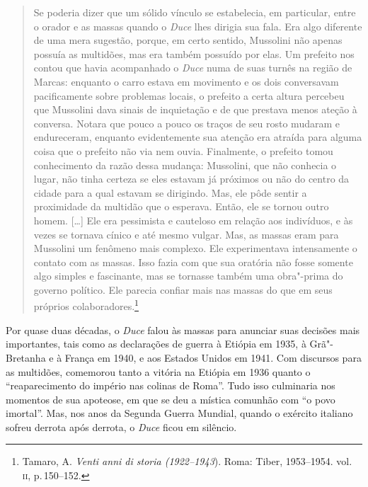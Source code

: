 \begin{quote}
Se poderia dizer que um sólido vínculo se estabelecia, em particular,
entre o orador e as massas quando o \emph{Duce} lhes dirigia sua fala.
Era algo diferente de uma mera sugestão, porque, em certo sentido,
Mussolini não apenas possuía as multidões, mas era também possuído por
elas. Um prefeito nos contou que havia acompanhado o \emph{Duce} numa de
suas turnês na região de Marcas: enquanto o carro estava em movimento e
os dois conversavam pacificamente sobre problemas locais, o prefeito a
certa altura percebeu que Mussolini dava sinais de inquietação e de que
prestava menos ateção à conversa. Notara que pouco a pouco os traços de
seu rosto mudaram e endureceram, enquanto evidentemente sua atenção era
atraída para alguma coisa que o prefeito não via nem ouvia. Finalmente,
o prefeito tomou conhecimento da razão dessa mudança: Mussolini, que não
conhecia o lugar, não tinha certeza se eles estavam já próximos ou não
do centro da cidade para a qual estavam se dirigindo. Mas, ele pôde
sentir a proximidade da multidão que o esperava. Então, ele se tornou
outro homem. {[}\ldots{}{]} Ele era pessimista e cauteloso em relação aos
indivíduos, e às vezes se tornava cínico e até mesmo vulgar. Mas, as
massas eram para Mussolini um fenômeno mais complexo. Ele experimentava
intensamente o contato com as massas. Isso fazia com que sua oratória
não fosse somente algo simples e fascinante, mas se tornasse também uma
obra"-prima do governo político. Ele parecia confiar mais nas massas do
que em seus próprios colaboradores.\footnote{Tamaro, A. \emph{Venti anni
  di storia (1922--1943}). Roma: Tiber, 1953--1954. vol. \textsc{ii}, p.\,150--152.}
\end{quote}

Por quase duas décadas, o \emph{Duce} falou às massas para anunciar suas
decisões mais importantes, tais como as declarações de guerra à Etiópia
em 1935, à Grã"-Bretanha e à França em 1940, e aos Estados Unidos em
1941. Com discursos para as multidões, comemorou tanto a vitória na
Etiópia em 1936 quanto o ``reaparecimento do império nas colinas de
Roma''. Tudo isso culminaria nos momentos de sua apoteose, em que se deu
a mística comunhão com ``o povo imortal''. Mas, nos anos da Segunda Guerra
Mundial, quando o exército italiano sofreu derrota após derrota, o
\emph{Duce} ficou em silêncio.

